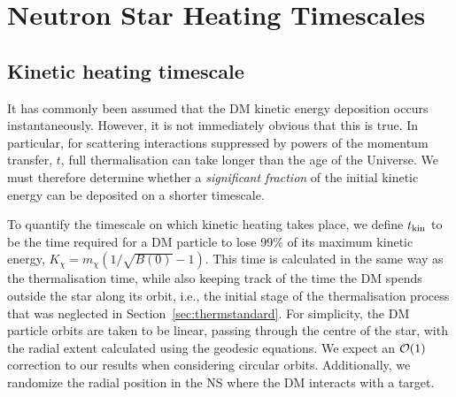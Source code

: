\section{Neutron Star Heating Timescales}
\label{ch6:sec:results}



\subsection{Kinetic heating timescale}
\label{ch6:subsec:KinHeating}


It has commonly been assumed that the DM kinetic energy deposition occurs instantaneously. However, it is not immediately obvious that this is true. In particular, for scattering interactions suppressed by powers of the momentum transfer, $t$, full thermalisation can take longer than the age of the Universe. We must therefore determine whether a {\it significant fraction} of the initial kinetic energy can be deposited on a shorter timescale.



To quantify the timescale on which kinetic heating takes place, we define $t_{\rm kin}$ to be the time required for a DM particle to lose 99\% of its maximum kinetic energy, $K_\chi = m_\chi (1/\sqrt{B(0)} - 1)$.  
This time is calculated in the same way as the thermalisation time, while also keeping track of the time the DM spends outside the star along its orbit, i.e., the initial stage of the thermalisation process that was neglected in Section~\ref{sec:thermstandard}. For simplicity, the DM particle orbits are taken to be linear, passing through the centre of the star, with the radial extent calculated using the geodesic equations. We expect an ${\cal O}(1)$ correction to our results when considering circular orbits.
Additionally, we randomize the radial position in the NS where the DM interacts with a target. 

